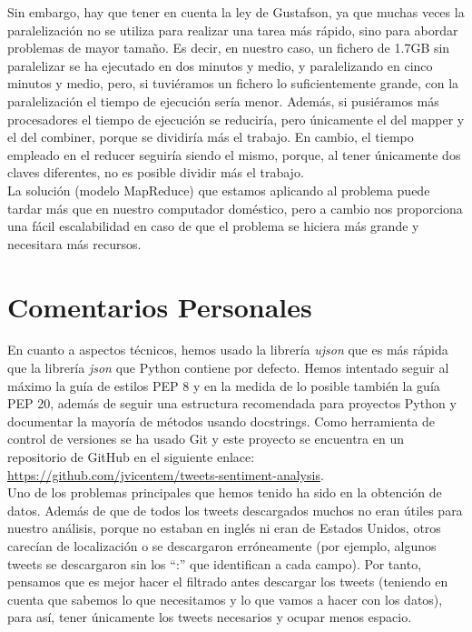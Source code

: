\documentclass[12pt,a4paper]{article}
\begin{document}
Sin embargo, hay que tener en cuenta la ley de Gustafson, ya que muchas veces la paralelización no se utiliza para realizar una tarea más rápido, sino para abordar problemas de mayor tamaño. Es decir, en nuestro caso, un fichero de 1.7GB sin paralelizar se ha ejecutado en dos minutos y medio, y paralelizando en cinco minutos y medio, pero, si tuviéramos un fichero lo suficientemente grande, con la paralelización el tiempo de ejecución sería menor. Además, si pusiéramos más procesadores el tiempo de ejecución se reduciría, pero únicamente el del mapper y el del combiner, porque se dividiría más el trabajo. En cambio, el tiempo empleado en el reducer seguiría siendo el mismo, porque, al tener únicamente dos claves diferentes, no es posible dividir más el trabajo.\\

La solución (modelo MapReduce) que estamos aplicando al problema puede tardar más que en nuestro computador doméstico, pero a cambio nos proporciona una fácil escalabilidad en caso de que el problema se hiciera más grande y necesitara más recursos.

\section{Comentarios Personales}

En cuanto a aspectos técnicos, hemos usado la librería \textit{ujson} que es más rápida que la librería \textit{json} que Python contiene por defecto. Hemos intentado seguir al máximo la guía de estilos PEP 8 y en la medida de lo posible también la guía PEP 20, además de seguir una estructura recomendada para proyectos Python y documentar la mayoría de métodos usando docstrings.
Como herramienta de control de versiones se ha usado Git y este proyecto se encuentra en un repositorio de GitHub en el siguiente enlace: \url{https://github.com/jvicentem/tweets-sentiment-analysis}.\\

Uno de los problemas principales que hemos tenido ha sido en la obtención de datos. Además de que de todos los tweets descargados muchos no eran útiles para nuestro análisis, porque no estaban en inglés ni eran de Estados Unidos, otros carecían de localización o se descargaron erróneamente (por ejemplo, algunos tweets se descargaron sin los ``:'' que identifican a cada campo). Por tanto, pensamos que es mejor hacer el filtrado antes descargar los tweets (teniendo en cuenta que sabemos lo que necesitamos y lo que vamos a hacer con los datos), para así, tener únicamente los tweets necesarios y ocupar menos espacio.\\
\end{document}
